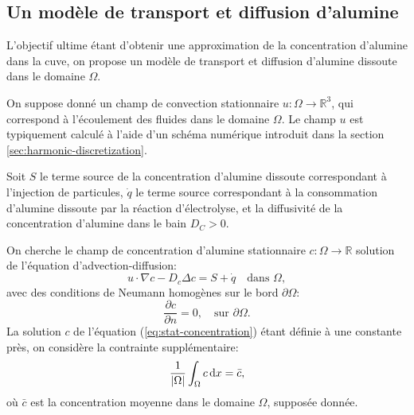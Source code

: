 


\subsection{Un modèle de transport et diffusion d'alumine}\label{sec:harmonic-c}
L'objectif ultime étant d'obtenir une approximation de la
concentration d'alumine dans la cuve, on propose un modèle de
transport et diffusion d'alumine dissoute dans le domaine $\Omega$.

On suppose donné un champ de convection stationnaire $u:\Omega\to\mathbb R^3$,
qui correspond à l'écoulement des fluides dans le domaine
$\Omega$. Le champ $u$ est typiquement calculé à l'aide d'un
schéma numérique introduit dans la section
\ref{sec:harmonic-discretization}.

Soit $S$ le terme source de la concentration d'alumine dissoute
correspondant à l'injection de particules, $\dot
q$ le terme source correspondant à la consommation d'alumine
dissoute par la réaction d'électrolyse, et la diffusivité de la
concentration d'alumine dans le bain $D_C > 0$.

On cherche le champ de concentration d'alumine stationnaire
$c:\Omega\to\mathbb R$ solution de l'équation d'advection-diffusion:
\begin{equation}\label{eq:stat-concentration}
  u\cdot \nabla c - D_c \Delta c = S + \dot q\quad \text{dans } \Omega,
\end{equation}
avec des conditions de Neumann homogènes sur le bord $\partial
\Omega$:
\begin{equation}
  \frac{\partial c}{\partial n} = 0,\quad\text{sur } \partial \Omega.
\end{equation}
La solution $c$ de l'équation (\ref{eq:stat-concentration}) étant
définie à une constante près, on considère la contrainte
supplémentaire:
\begin{equation}
  \frac{1}{\left\lvert \Omega \right\rvert}\int_\Omega c\,\mathrm dx = \bar c,
\end{equation}
où $\bar c$ est la concentration moyenne dans le domaine $\Omega$,
supposée donnée.

